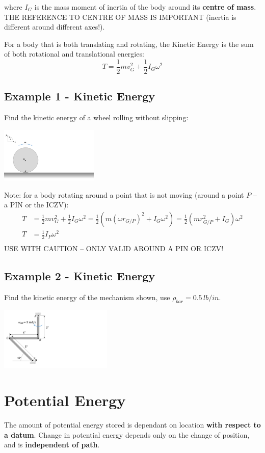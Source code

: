 \documentclass[12pt,letterpaper,twoside]{report}
\begin{document}
where $I_G$ is the mass moment of inertia of the body around its \textbf{centre of mass}.  THE REFERENCE TO CENTRE OF MASS IS IMPORTANT (inertia is different around different axes!).

For a body that is both translating and rotating, the Kinetic Energy is the sum of both rotational and translational energies:
\[
T = \frac{1}{2} m v_G^2 + \frac{1}{2} I_G \omega^2
\]

\subsection{Example 1 - Kinetic Energy}
Find the kinetic energy of a wheel rolling without slipping:

 \includegraphics[trim={0cm 1cm 20cm 1cm},clip,width=0.35\textwidth, left]{Slide67}

\newpage

Note:  for a body rotating around a point that is not moving
(around a point $P$ – a PIN or the ICZV):
\begin{align*}
T &= \frac{1}{2} m v_G^2 + \frac{1}{2} I_G \omega^2 = \frac{1}{2} ( m (\omega r_{G/P})^2 +  I_G \omega^2) =  \frac{1}{2} ( m  r_{G/P}^2 +  I_G) \omega^2\\
T &=  \frac{1}{2} I_P \omega^2 \\
\end{align*}
USE WITH CAUTION – ONLY VALID AROUND A PIN OR ICZV!

\subsection{Example 2 - Kinetic Energy}
Find the kinetic energy of the mechanism shown, use $\rho_{bar}=0.5 \, lb/in$.

 \includegraphics[trim={0cm 1cm 19cm 0cm},clip,width=0.4\textwidth, left]{Slide68}
\newpage


\section{Potential Energy}
The amount of potential energy stored is dependant on location \textbf{with respect to a datum}.  Change in potential energy depends only on the change of position, and is \textbf{independent of path}.
\end{document}
